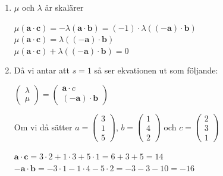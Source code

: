 \documentclass[a4paper]{report}
\begin{document}
\begin{enumerate}
\begin{enumerate}
            \item
                $\mu$ och $\lambda$ är skalärer
                \begin{center}
                    $\mu (\bm{a}\cdot \bm{c}) = -\lambda (\bm{a}\cdot \bm{b}) = (-1)\cdot \lambda ((-\bm{a})\cdot \bm{b})$\\
                    $\mu (\bm{a}\cdot \bm{c}) = \lambda ((-\bm{a})\cdot \bm{b})$\\
                    $\mu (\bm{a}\cdot \bm{c}) + \lambda ((-\bm{a})\cdot\bm{b})=0$
                \end{center}
            \item
                Då vi antar att $s=1$ så ser ekvationen ut som följande:
                \begin{center}
                    $\begin{pmatrix}\lambda\\\mu\end{pmatrix}=\begin{pmatrix}\bm{a}\cdot c\\ (-\bm{a})\cdot \bm{b}\end{pmatrix}$
                \end{center}
                Om vi då sätter 
                $a=\begin{pmatrix}3\\1\\5\end{pmatrix}$, $b=\begin{pmatrix}1\\4\\2\end{pmatrix}$ och $c=\begin{pmatrix}2\\3\\1\end{pmatrix}$\\
                \begin{center}
                    $\bm{a}\cdot \bm{c} = 3\cdot 2 + 1\cdot 3 + 5\cdot 1 = 6 + 3 + 5 = 14$\\
                    $-\bm{a}\cdot \bm{b} = -3\cdot 1 - 1\cdot 4 - 5\cdot 2 = -3 -3 -10 = -16$
                \end{center}
        \end{enumerate}
\end{enumerate}
\end{document}
